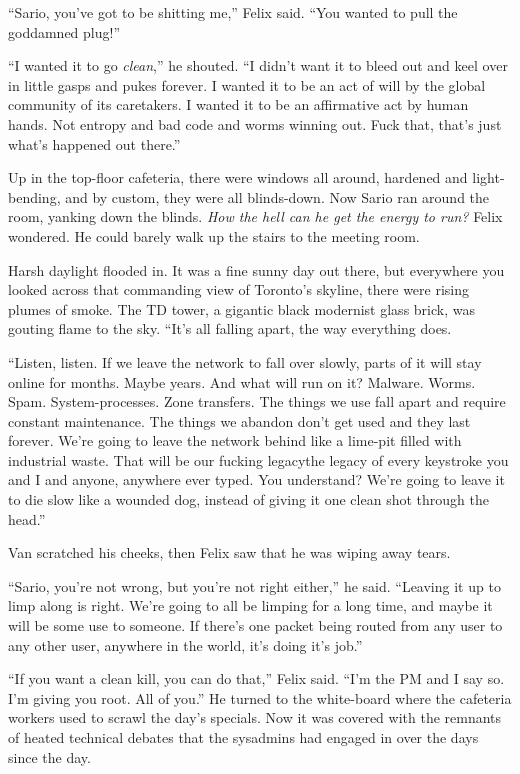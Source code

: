“Sario, you’ve got to be shitting me,” Felix said. “You wanted to
pull the goddamned plug!”

“I wanted it to go \emph{clean},” he shouted. “I didn’t want it to
bleed out and keel over in little gasps and pukes forever. I wanted
it to be an act of will by the global community of its caretakers.
I wanted it to be an affirmative act by human hands. Not entropy
and bad code and worms winning out. Fuck that, that’s just what’s
happened out there.”

Up in the top-floor cafeteria, there were windows all around,
hardened and light-bending, and by custom, they were all
blinds-down. Now Sario ran around the room, yanking down the
blinds. \emph{How the hell can he get the energy to run?} Felix
wondered. He could barely walk up the stairs to the meeting room.

Harsh daylight flooded in. It was a fine sunny day out there, but
everywhere you looked across that commanding view of Toronto’s
skyline, there were rising plumes of smoke. The TD tower, a
gigantic black modernist glass brick, was gouting flame to the sky.
“It’s all falling apart, the way everything does.

“Listen, listen. If we leave the network to fall over slowly, parts
of it will stay online for months. Maybe years. And what will run
on it? Malware. Worms. Spam. System-processes. Zone transfers. The
things we use fall apart and require constant maintenance. The
things we abandon don’t get used and they last forever. We’re going
to leave the network behind like a lime-pit filled with industrial
waste. That will be our fucking legacy\dash{}the legacy of every
keystroke you and I and anyone, anywhere ever typed. You
understand? We’re going to leave it to die slow like a wounded dog,
instead of giving it one clean shot through the head.”

Van scratched his cheeks, then Felix saw that he was wiping away
tears.

“Sario, you’re not wrong, but you’re not right either,” he said.
“Leaving it up to limp along is right. We’re going to all be
limping for a long time, and maybe it will be some use to someone.
If there’s one packet being routed from any user to any other user,
anywhere in the world, it’s doing it’s job.”

“If you want a clean kill, you can do that,” Felix said. “I’m the
PM and I say so. I’m giving you root. All of you.” He turned to the
white-board where the cafeteria workers used to scrawl the day’s
specials. Now it was covered with the remnants of heated technical
debates that the sysadmins had engaged in over the days since the
day.

